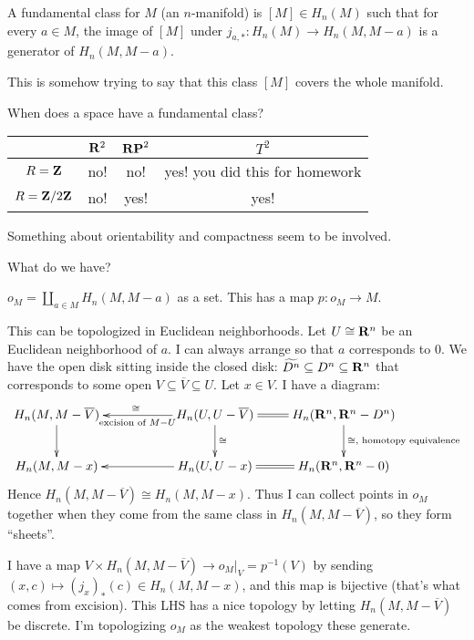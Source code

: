 \begin{definition}
A fundamental class for $M$ (an $n$-manifold) is $[M]\in H_n(M)$ such that for every $a\in M$, the image of $[M]$ under $j_{a,\ast}:H_n(M)\to H_n(M,M-a)$ is a generator of $H_n(M,M-a)$.
\end{definition}
This is somehow trying to say that this class $[M]$ covers the whole manifold.
\begin{example}
When does a space have a fundamental class?
\begin{center}
\begin{tabular}{c|c c c } 
 \hline
  & $\mathbf R^2$ & $\mathbf{RP}^2$ & $T^2$ \\ 
  \hline
 $R=\mathbf Z$ & no! & no! & yes! you did this for homework \\
 $R=\mathbf Z/2\mathbf Z$ & no! & yes! & yes!
\end{tabular}
\end{center}
Something about orientability and compactness seem to be involved.
\end{example}
What do we have? 
\begin{definition}
$o_M=\coprod_{a\in M}H_n(M,M-a)$ as a set. This has a map $p:o_M\to M$.
\end{definition}
\begin{construction}
This can be topologized in Euclidean neighborhoods. Let $U\cong\mathbf R^n$ be an Euclidean neighborhood of $a$. I can always arrange so that $a$ corresponds to $0$. We have the open disk sitting inside the closed disk: $\widetilde{D^n}\subseteq D^n\subseteq \mathbf R^n$ that corresponds to some open $V\subseteq \overline{V}\subseteq U$. Let $x\in V$. I have a diagram:
\begin{equation*}
\xymatrix{
	H_n(M,M-\overline{V})\ar[d] & & H_n(U,U-\overline{V})\ar[ll]^{\text{ excision of }M-U}_{\cong}\ar[d]^\cong & H_n(\RR^n,\RR^n-D^n)\ar@{=}[l]\ar[d]^{\cong,\text{ homotopy equivalence}}\\
	H_n(M,M-x) & & H_n(U,U-x)\ar[ll] & H_n(\RR^n,\RR^n-0)\ar@{=}[l]
}
\end{equation*}
Hence $H_n(M,M-\overline{V})\cong H_n(M,M-x)$. Thus I can collect points in $o_M$ together when they come from the same class in $H_n(M,M-\overline{V})$, so they form ``sheets''.

I have a map $V\times H_n(M,M-\overline{V})\to o_M|_{V}=p^{-1}(V)$ by sending $(x,c)\mapsto (j_x)_\ast(c)\in H_n(M,M-x)$, and this map is bijective (that's what comes from excision). This LHS has a nice topology by letting $H_n(M,M-\overline{V})$ be discrete. I'm topologizing $o_M$ as the weakest topology these generate.
\end{construction}
